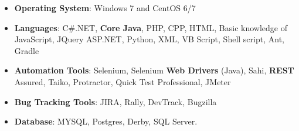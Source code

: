 \begin{cvparagraph}
\begin{itemize}
\item {\textbf{Operating System}: Windows 7 and CentOS 6/7}
\item {\textbf{Languages}: C\#.NET, \textbf{Core Java}, PHP, CPP, HTML, Basic knowledge of JavaScript, JQuery ASP.NET, Python, XML, VB Script, Shell script, Ant, Gradle}
\item {\textbf{Automation  Tools}: Selenium, Selenium \textbf{Web Drivers} (Java), Sahi, \textbf{REST} Assured, Taiko, Protractor, Quick Test Professional, JMeter}
\item {\textbf{Bug Tracking Tools}: JIRA, Rally, DevTrack, Bugzilla }
\item {\textbf{Database}: MYSQL, Postgres, Derby, SQL Server.}
\end{itemize}
\end{cvparagraph}